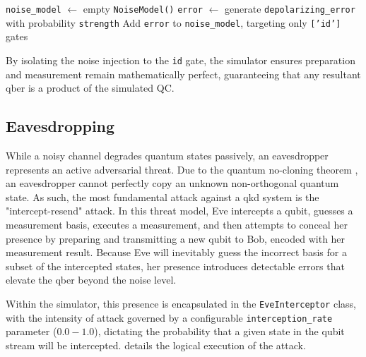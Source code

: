 \begin{algorithm}[H]
    \caption{AerSimulator Backend Generation for Channel Noise}\label{alg:noise_model}
    \texttt{noise\_model} $\leftarrow$ empty \texttt{NoiseModel()}\;
    \texttt{error} $\leftarrow$ generate \texttt{depolarizing\_error} with probability \texttt{strength}\; 
    Add \texttt{error} to \texttt{noise\_model}, targeting only \texttt{['id']} gates\; 
\end{algorithm}

By isolating the noise injection to the \texttt{id} gate, the simulator ensures preparation and measurement remain mathematically perfect, guaranteeing that any resultant \gls{qber} is a product of the simulated QC.

\subsection{Eavesdropping}
\label{subsec:eavesdropping}
While a noisy channel degrades quantum states passively, an eavesdropper represents an active adversarial threat. Due to the quantum no-cloning theorem \cite{WZ1982}, an eavesdropper cannot perfectly copy an unknown non-orthogonal quantum state. As such, the most fundamental attack against a \gls{qkd} system is the "intercept-resend" attack. In this threat model, Eve intercepts a qubit, guesses a measurement basis, executes a measurement, and then attempts to conceal her presence by preparing and transmitting a new qubit to Bob, encoded with her measurement result. Because Eve will inevitably guess the incorrect basis for a subset of the intercepted states, her presence introduces detectable errors that elevate the \gls{qber} beyond the noise level.
 
Within the simulator, this presence is encapsulated in the \texttt{EveInterceptor} class, with the intensity of attack governed by a configurable \texttt{interception\_rate} parameter ($0.0-1.0$), dictating the probability that a given state in the qubit stream will be intercepted.  details the logical execution of the attack.

